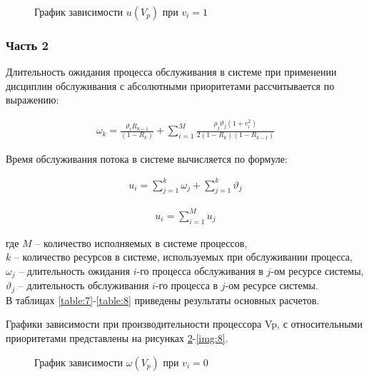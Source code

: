 \begin{figure}[H]
	\renewcommand{\figurename}{Рисунок}
	\caption{График зависимости $u(V_p)$ при $v_i = 1$}
	\label{img:4}
\end{figure}

\subsubsection*{Часть 2}

Длительность ожидания процесса обслуживания в системе при применении дисциплин обслуживания с абсолютными приоритетами рассчитывается по выражению:

\begin{align}
\omega_k = \frac{\vartheta_iR_{k-1}}{(1-R_k)} + \sum_{i=1}^{M}\frac{\rho_j\vartheta_j(1+v^2_i)}{2(1-R_k)(1-R_{k-1})}
\label{formul:5}
\end{align}

Время обслуживания потока в системе вычисляется по формуле:

\begin{align}
u_i = \sum_{j=1}^{k}\omega_j+\sum_{j=1}^{k}\vartheta_j
\label{formul:6}
\end{align}

\begin{align}
u_i = \sum_{i=1}^{M}u_j
\label{formul:7}
\end{align}

где
$M$ -- количество исполняемых в системе процессов, \\
$k$ -- количество ресурсов в системе, используемых при обслуживании процесса, \\
$\omega_j$ -- длительность ожидания $i$-го процесса обслуживания в $j$-ом ресурсе системы, \\
$\vartheta_j$ -- длительность обслуживания $i$-го процесса в $j$-ом ресурсе системы. \\

В таблицах \ref{table:7}-\ref{table:8} приведены результаты основных расчетов.




Графики зависимости при производительности процессора Vp, с относительными приоритетами представлены на рисунках \ref{img:5}-\ref{img:8}.

\begin{figure}[H]
	\renewcommand{\figurename}{Рисунок}
	\caption{График зависимости $\omega(V_p)$ при $v_i = 0$}
	\label{img:5}
\end{figure}

